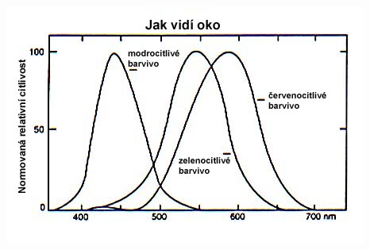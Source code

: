 \begin{frame}
\begin{columns}[c]
        \includegraphics[width=\textwidth]{pics/color/citlivost-oka-normovana}
    \end{columns}
\end{frame}

